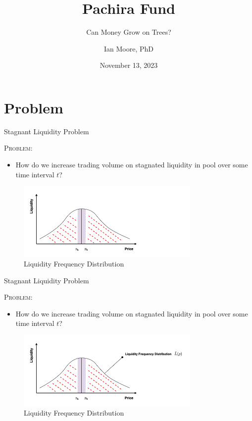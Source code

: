 \documentclass[10pt,xcolor=svgnames]{beamer} %
\title{Pachira Fund}
\author[Name]{Ian Moore, PhD \inst{$\dagger$}}%
\subtitle{Can Money Grow on Trees?}
\institute[shortinst]{\inst{$\dagger$} Tokenomics Researcher / Engineer @ Syslabs (email: imoore@syscoin.org) }
\date{November 13, 2023} %
\begin{document}
{

}%


\section{Problem}

\begin{frame}{Stagnant Liquidity Problem} 

\begin{exampleblock}{\textsc{Problem:}}
\begin{itemize}
  \item How do we increase trading volume on stagnated liquidity in pool over some time interval $t$?
\end{itemize}
\end{exampleblock}

\begin{figure}[h!]
\includegraphics[width=3.5in]{img/freq0.png}
\caption{ Liquidity Frequency Distribution} 
\label{fig:full_tree}
\end{figure}

\end{frame}



\begin{frame}{Stagnant Liquidity Problem} 

\begin{exampleblock}{\textsc{Problem:}}
\begin{itemize}
  \item How do we increase trading volume on stagnated liquidity in pool over some time interval $t$?
\end{itemize}
\end{exampleblock}

\begin{figure}[h!]
\includegraphics[width=3.5in]{img/freq1.png}
\caption{ Liquidity Frequency Distribution} 
\label{fig:full_tree}
\end{figure}

\end{frame}
\end{document}
